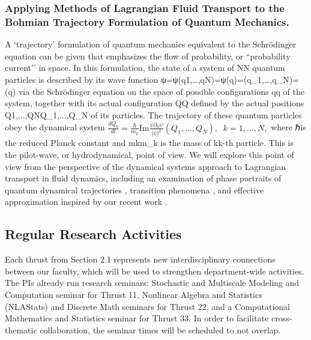 \documentclass[11pt]{NSFamsart}
\begin{document}
\subsubsection*{Applying Methods of Lagrangian Fluid Transport to the Bohmian Trajectory Formulation of Quantum Mechanics.}   A `trajectory'  formulation of quantum mechanics  equivalent to the Schr\"{o}dinger equation can be given \cite{Bohmian, Holland1993TheQT} that emphasizes the flow of probability, or ``probability current’’ in space. 
In this formulation, the state of a system of NN quantum particles is described by its wave function ψ=ψ(q1,…,qN)=ψ(q)\psi=\psi(q_1,…,q_N)=\psi(q) via the Schr\"{o}dinger equation  on the space of possible configurations qq of the system, together with its actual configuration QQ defined by the actual positions Q1,...,QNQ_1,...,Q_N of its particles. The trajectory of these quantum particles obey the dynamical system
$
\frac{dQ_k}{dt}= \frac{\hbar}{m_k} \text{Im} \frac{\bar\psi  \partial_k \psi}{|\psi|^2}(Q_1,…,Q_N),\;\; k=1, ..., N,  
$
where ℏ\hbar is the reduced Planck constant and mkm_k is the mass of kk-th particle.
This is the pilot-wave, or hydrodynamical, point of view. We will explore this point of view from the perspective of the dynamical systems approach to Lagrangian transport in fluid dynamics, including an examination of phase portraits of quantum dynamical trajectories \cite{Berndl1995OnTG}, transition phenomena \cite{waalkens2007wigner,Micha2006QuantumDW, Dittrich2016}, and effective approximation inspired by our recent work \cite{Li2021BohmianTO}. 
\fi


\subsection{Regular Research  Activities}\label{section:regular research activities}
Each thrust from Section 2.1 represents new interdisciplinary connections between our faculty, which will be used to strengthen department-wide activities. The PIs already run  research seminars: 
Stochastic and Multiscale Modeling and Computation seminar for Thrust 11, Nonlinear Algebra and Statistics (NLAStats) and Discrete Math seminars for Thrust 22, and a Computational Mathematics and Statistics seminar for Thrust 33.
In order to facilitate cross-thematic collaboration, the seminar times will be scheduled to not overlap. 
\end{document}
